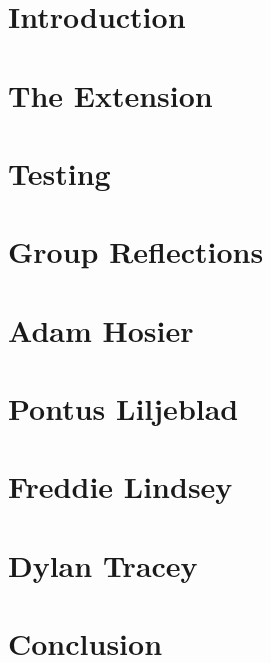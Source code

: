 \documentclass[11pt]{article}
\begin{document}


\maketitle

\section{Introduction}


  
\section{The Extension}



\section{Testing}



\section{Group Reflections}



\section{Adam Hosier}



\section{Pontus Liljeblad}



\section{Freddie Lindsey}



\section{Dylan Tracey}



\section{Conclusion}


\end{document}
